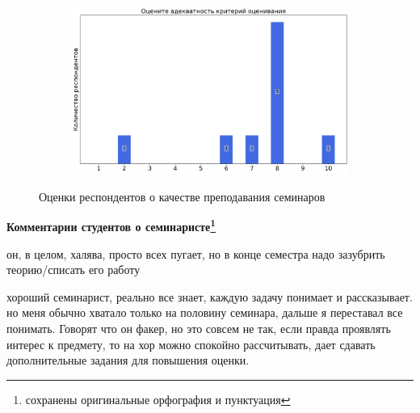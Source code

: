 \begin{figure}[H]
\begin{subfigure}[b]{0.45\textwidth}
			\end{subfigure}
			\begin{subfigure}[b]{0.45\textwidth}
				\centering
				\includegraphics[width=\textwidth]{images/1 course/Дискретный анализ/seminarists-marks-Плетнёв Н.В.-3.png}
			\end{subfigure}	
			\caption{Оценки респондентов о качестве преподавания семинаров}
		\end{figure}

		\textbf{Комментарии студентов о семинаристе\protect\footnote{сохранены оригинальные орфография и пунктуация}}
            \begin{commentbox} 
                он, в целом, халява, просто всех пугает, но в конце семестра надо зазубрить теорию/списать его работу 
            \end{commentbox} 
        
            \begin{commentbox} 
                хороший семинарист, реально все знает, каждую задачу понимает и рассказывает. но меня обычно хватало только на половину семинара, дальше я переставал все понимать. Говорят что он факер, но это совсем не так, если правда проявлять интерес к предмету, то на хор можно спокойно рассчитывать, дает сдавать дополнительные задания для повышения оценки.  
            \end{commentbox} 

        
